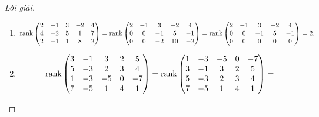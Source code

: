 \documentclass[class=linearalgebra,crop=false]{standalone}
\begin{document}
\begin{proof}[Lời giải]
    \begin{enumerate}[label = (\alph*)]
        \item
              \begingroup
              \allowdisplaybreaks
              \begin{gather*}
                  \text{rank}\begin{pmatrix}
                      2 & -1 & 3 & -2 & 4 \\
                      4 & -2 & 5 & 1  & 7 \\
                      2 & -1 & 1 & 8  & 2
                  \end{pmatrix}
                  =\text{rank}\begin{pmatrix}
                      2 & -1 & 3  & -2 & 4  \\
                      0 & 0  & -1 & 5  & -1 \\
                      0 & 0  & -2 & 10 & -2
                  \end{pmatrix}
                  =\text{rank}\begin{pmatrix}
                      2 & -1 & 3  & -2 & 4  \\
                      0 & 0  & -1 & 5  & -1 \\
                      0 & 0  & 0  & 0  & 0
                  \end{pmatrix}
                  = 2.
              \end{gather*}
              \endgroup
        \item
              \begingroup
              \allowdisplaybreaks
              \begin{gather*}
                  \rank\begin{pmatrix}
                      3 & -1 & 3  & 2 & 5  \\
                      5 & -3 & 2  & 3 & 4  \\
                      1 & -3 & -5 & 0 & -7 \\
                      7 & -5 & 1  & 4 & 1
                  \end{pmatrix} =
                  \rank\begin{pmatrix}
                      1 & -3 & -5 & 0 & -7 \\
                      3 & -1 & 3  & 2 & 5  \\
                      5 & -3 & 2  & 3 & 4  \\
                      7 & -5 & 1  & 4 & 1
                  \end{pmatrix} =

\end{gather*}
\end{enumerate}
\end{proof}
\end{document}
